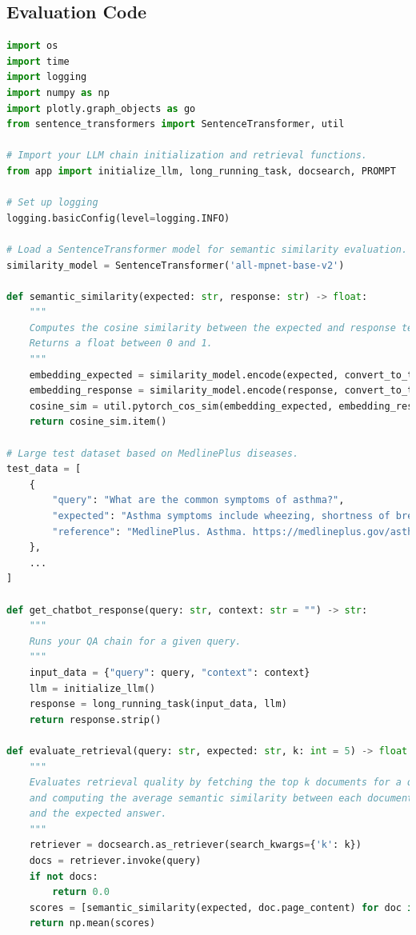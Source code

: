 \subsection{Evaluation Code}
\label{subsec:evaluation-code}

\begin{lstlisting}[language=Python, caption={Evaluation Code for Chatbot Responses and Retrieval Quality}, basicstyle=\small\ttfamily]
import os
import time
import logging
import numpy as np
import plotly.graph_objects as go
from sentence_transformers import SentenceTransformer, util

# Import your LLM chain initialization and retrieval functions.
from app import initialize_llm, long_running_task, docsearch, PROMPT

# Set up logging
logging.basicConfig(level=logging.INFO)

# Load a SentenceTransformer model for semantic similarity evaluation.
similarity_model = SentenceTransformer('all-mpnet-base-v2')

def semantic_similarity(expected: str, response: str) -> float:
    """
    Computes the cosine similarity between the expected and response text.
    Returns a float between 0 and 1.
    """
    embedding_expected = similarity_model.encode(expected, convert_to_tensor=True)
    embedding_response = similarity_model.encode(response, convert_to_tensor=True)
    cosine_sim = util.pytorch_cos_sim(embedding_expected, embedding_response)
    return cosine_sim.item()

# Large test dataset based on MedlinePlus diseases.
test_data = [
    {
        "query": "What are the common symptoms of asthma?",
        "expected": "Asthma symptoms include wheezing, shortness of breath, chest tightness, and coughing.",
        "reference": "MedlinePlus. Asthma. https://medlineplus.gov/asthma.html"
    },
    ...
]

def get_chatbot_response(query: str, context: str = "") -> str:
    """
    Runs your QA chain for a given query.
    """
    input_data = {"query": query, "context": context}
    llm = initialize_llm()
    response = long_running_task(input_data, llm)
    return response.strip()

def evaluate_retrieval(query: str, expected: str, k: int = 5) -> float:
    """
    Evaluates retrieval quality by fetching the top k documents for a query
    and computing the average semantic similarity between each document's content
    and the expected answer.
    """
    retriever = docsearch.as_retriever(search_kwargs={'k': k})
    docs = retriever.invoke(query)
    if not docs:
        return 0.0
    scores = [semantic_similarity(expected, doc.page_content) for doc in docs]
    return np.mean(scores)


\end{lstlisting}
